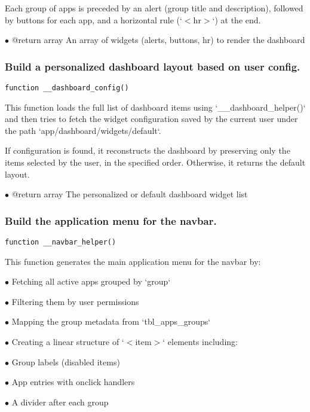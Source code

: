 \documentclass[a4paper]{article}
\begin{document}
Each group of apps is preceded by an alert (group title and description),
followed by buttons for each app, and a horizontal rule (`$<$hr$>$`) at the end.

\begin{compactitem}
\item[\color{myblue}$\bullet$] @return array An array of widgets (alerts, buttons, hr) to render the dashboard
\end{compactitem}

\hypertarget{toc46}{}
\subsubsection{Build a personalized dashboard layout based on user config.}

\begin{lstlisting}
function __dashboard_config()
\end{lstlisting}

This function loads the full list of dashboard items using `\_\_dashboard\_helper()`
and then tries to fetch the widget configuration saved by the current user
under the path `app/dashboard/widgets/default`.

If configuration is found, it reconstructs the dashboard by preserving only
the items selected by the user, in the specified order. Otherwise, it returns
the default layout.

\begin{compactitem}
\item[\color{myblue}$\bullet$] @return array The personalized or default dashboard widget list
\end{compactitem}

\hypertarget{toc47}{}
\subsubsection{Build the application menu for the navbar.}

\begin{lstlisting}
function __navbar_helper()
\end{lstlisting}

This function generates the main application menu for the navbar by:

\begin{compactitem}
\item[\color{myblue}$\bullet$] Fetching all active apps grouped by `group`
\item[\color{myblue}$\bullet$] Filtering them by user permissions
\item[\color{myblue}$\bullet$] Mapping the group metadata from `tbl\_apps\_groups`
\item[\color{myblue}$\bullet$] Creating a linear structure of `$<$item$>$` elements including:
  \begin{compactitem}
  \item[\color{myblue}$\bullet$] Group labels (disabled items)
  \item[\color{myblue}$\bullet$] App entries with onclick handlers
  \item[\color{myblue}$\bullet$] A divider after each group
  \end{compactitem}
\end{compactitem}
\end{document}
